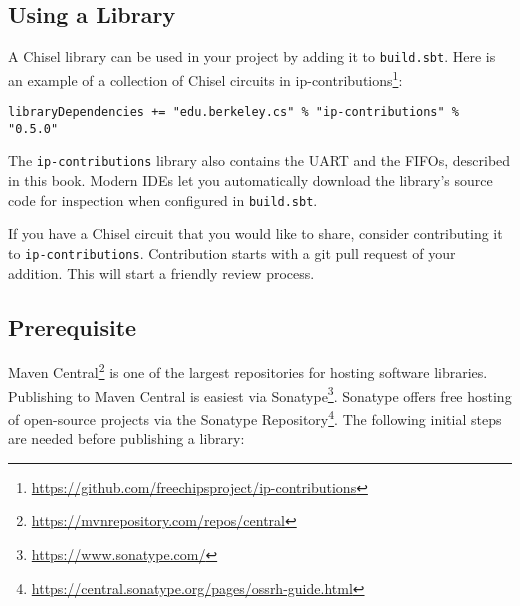 \documentclass[%
    10pt,
    headinclude, footexclude,
    openright, %
    notitlepage,
    cleardoubleempty,
    headsepline,
    pointlessnumbers,
    bibtotoc, idxtotoc,
    ]{scrbook}
\newcommand{\code}[1]{{\lstinline[basicstyle=\small\ttfamily]{#1}}}
\newcommand{\myref}[2]{\href{#1}{#2}}
\renewcommand{\myref}[2]{{#2}{\footnote{\url{#1}}}}
\begin{document}
\subsection{Using a Library}

A Chisel library can be used in your project by adding it to \code{build.sbt}. Here is an
example of a collection of Chisel circuits in \myref{https://github.com/freechipsproject/ip-contributions}{ip-contributions}:

\begin{verbatim}
libraryDependencies += "edu.berkeley.cs" % "ip-contributions" % "0.5.0"
\end{verbatim}

\noindent The \code{ip-contributions} library also contains the UART and the FIFOs, described in this book.
Modern IDEs let you automatically download the library's source code for inspection when configured
in \code{build.sbt}.

If you have a Chisel circuit that you would like to share, consider contributing it to \code{ip-contributions}.
Contribution starts with a git pull request of your addition. This will start a friendly review process.

\subsection{Prerequisite}

\myref{https://mvnrepository.com/repos/central}{Maven Central} is one of the largest repositories for
hosting software libraries. Publishing to Maven Central is easiest via
\myref{https://www.sonatype.com/}{Sonatype}. Sonatype offers free hosting of open-source
projects via the \myref{https://central.sonatype.org/pages/ossrh-guide.html}{Sonatype Repository}.
The following initial steps are needed before publishing a library:
\end{document}
